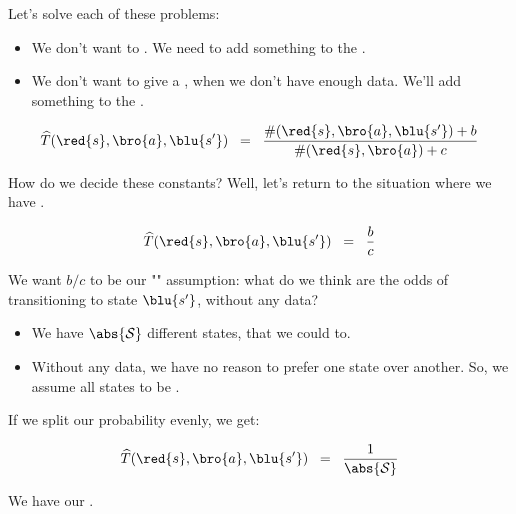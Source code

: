         Let's solve each of these problems:
    
        \begin{itemize}
            \item We don't want to . We need to add something to the .

            \item We don't want to give a , when we don't have enough data. We'll add something to the .
        \end{itemize}

        \begin{equation}
            \qquad 
            \widehat{T} (\red{s},\bro{a},\blu{s'})  \;\;=\;\;
            \frac{\#(\red{s},\bro{a},\blu{s'}) + b}{\#(\red{s},\bro{a}) + c} 
            \qquad 
        \end{equation}

        How do we decide these constants? Well, let's return to the situation where we have .

        \begin{equation}
            \qquad 
            \widehat{T}(\red{s},\bro{a},\blu{s'}) \;\;=\;\;
            \frac{b}{c} 
            \qquad 
        \end{equation}

        We want $b/c$ to be our "" assumption: what do we think are the odds of transitioning to state $\blu{s'}$, without any data?

        \begin{itemize}
            \item We have $\abs{\mathcal{S}}$ different states, that we could  to. 
            \item Without any data, we have no reason to prefer one state over another. So, we assume all states to be .
        \end{itemize}

        If we split our probability evenly, we get:

        \begin{equation}
            \qquad 
            \widehat{T}(\red{s},\bro{a},\blu{s'}) \;\;=\;\;
            \frac{1}{\abs{\mathcal{S}}}
            \qquad 
        \end{equation}

        We have our .\\

